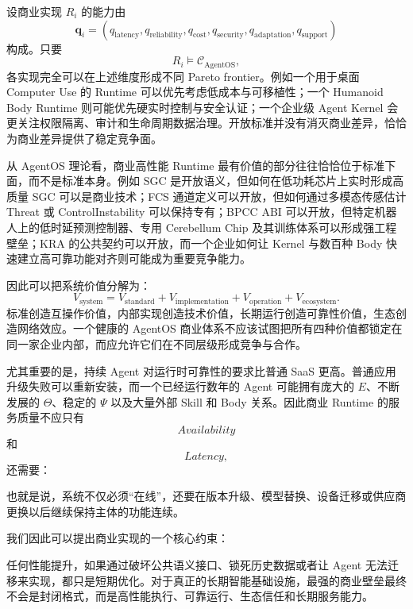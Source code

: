 设商业实现 $R_i$ 的能力由
\[
\mathbf q_i
=
(q_{\mathrm{latency}},
q_{\mathrm{reliability}},
q_{\mathrm{cost}},
q_{\mathrm{security}},
q_{\mathrm{adaptation}},
q_{\mathrm{support}})
\]
构成。只要
\[
R_i\models\mathcal C_{\mathrm{AgentOS}},
\]
各实现完全可以在上述维度形成不同 Pareto frontier。例如一个用于桌面 Computer Use 的 Runtime 可以优先考虑低成本与可移植性；一个 Humanoid Body Runtime 则可能优先硬实时控制与安全认证；一个企业级 Agent Kernel 会更关注权限隔离、审计和生命周期数据治理。开放标准并没有消灭商业差异，恰恰为商业差异提供了稳定竞争面。

从 AgentOS 理论看，商业高性能 Runtime 最有价值的部分往往恰恰位于标准下面，而不是标准本身。例如 SGC 是开放语义，但如何在低功耗芯片上实时形成高质量 SGC 可以是商业技术；FCS 通道定义可以开放，但如何通过多模态传感估计 Threat 或 ControlInstability 可以保持专有；BPCC ABI 可以开放，但特定机器人上的低时延预测控制器、专用 Cerebellum Chip 及其训练体系可以形成强工程壁垒；KRA 的公共契约可以开放，而一个企业如何让 Kernel 与数百种 Body 快速建立高可靠功能对齐则可能成为重要竞争能力。

因此可以把系统价值分解为：
\[
V_{\mathrm{system}}
=
V_{\mathrm{standard}}
+
V_{\mathrm{implementation}}
+
V_{\mathrm{operation}}
+
V_{\mathrm{ecosystem}}.
\]
标准创造互操作价值，内部实现创造技术价值，长期运行创造可靠性价值，生态创造网络效应。一个健康的 AgentOS 商业体系不应该试图把所有四种价值都锁定在同一家企业内部，而应允许它们在不同层级形成竞争与合作。

尤其重要的是，持续 Agent 对运行时可靠性的要求比普通 SaaS 更高。普通应用升级失败可以重新安装，而一个已经运行数年的 Agent 可能拥有庞大的 $E$、不断发展的 $\Theta$、稳定的 $\Psi$ 以及大量外部 Skill 和 Body 关系。因此商业 Runtime 的服务质量不应只有
\[
Availability
\]
和
\[
Latency,
\]
还需要：
\begin{statementbox}
\centering
{}
\end{statementbox}
也就是说，系统不仅必须``在线''，还要在版本升级、模型替换、设备迁移或供应商更换以后继续保持主体的功能连续。

我们因此可以提出商业实现的一个核心约束：
\begin{statementbox}
\centering
{}
\end{statementbox}
任何性能提升，如果通过破坏公共语义接口、锁死历史数据或者让 Agent 无法迁移来实现，都只是短期优化。对于真正的长期智能基础设施，最强的商业壁垒最终不会是封闭格式，而是高性能执行、可靠运行、生态信任和长期服务能力。


